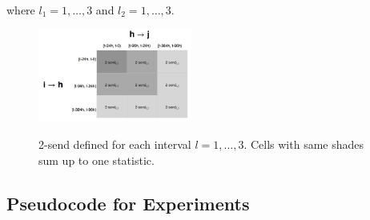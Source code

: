 \documentclass[twoside]{article}
\begin{document}
    where $l_1=1,\ldots,3$ and $l_2=1,\ldots,3$. 
    \begin{figure}[ht]
    	\centering
    	\includegraphics[width=0.45\textwidth]{plots/triadtable.jpg} 
    	\label{fig:triadtable}
    	\caption{2-send defined for each interval $l=1,\ldots,3$. Cells with same shades sum up to one statistic.}
    \end{figure}
    
    \subsection{Pseudocode for Experiments} \label{subsec:Pseudocode for Experiments}
\end{document}
